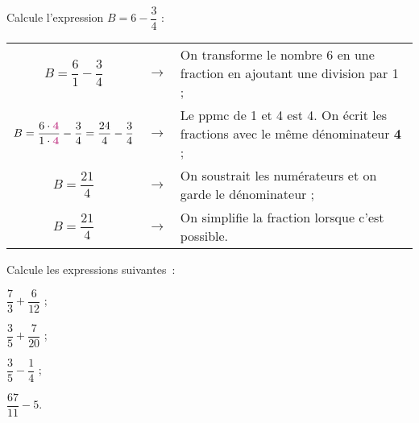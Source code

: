 \begin{methode*1}
\begin{exemple*1}
Calcule l'expression $B = 6 - \dfrac{3}{4}$ :
\vspace{.3em}
\begin{center}
 \begin{tabularx}{1.05\linewidth}{ccX}
  $B = \dfrac{6}{1} - \dfrac{3}{4}$ & $\rightarrow$ & On transforme le nombre 6 en une fraction en ajoutant une division par 1 ; \\
  $B = \dfrac{6 \cdot \text{\textbf{\textcolor{C2}{4}}}}{1 \cdot \text{\textbf{\textcolor{C2}{4}}}} - \dfrac{3}{4} = \dfrac{24}{4} - \dfrac{3}{4}$ & $\rightarrow$ & Le ppmc de 1 et 4 est 4. On écrit les fractions avec le même dénominateur \textcolor{H1}{\textbf{4}} ; \\
  $B = \dfrac{21}{4}$ & $\rightarrow$ & On soustrait les numérateurs et on garde le dénominateur ; \\
  $B = \dfrac{21}{4}$ & $\rightarrow$ & On simplifie la fraction lorsque c'est possible.
  \end{tabularx}
\end{center}
 \end{exemple*1}
 
  \exercice
Calcule les expressions suivantes :
\begin{colenumerate}{2} 
 \item $\dfrac{7}{3} + \dfrac{6}{12}$ \dotfill;
 \vspace{.8em}
 \item $\dfrac{3}{5} + \dfrac{7}{20}$ \dotfill;
 \vspace{.8em}
 \item $\dfrac{3}{5} - \dfrac{1}{4}$ \dotfill;
 \vspace{.8em}
 \item $\dfrac{67}{11} - 5$\dotfill.
 \end{colenumerate}

 \end{methode*1}

